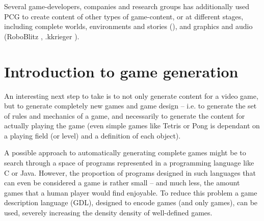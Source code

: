 \documentclass[a4paper,titlepage,final]{report}
\begin{document}
Several game-developers, companies and research groups has additionally used PCG to create content of other types of game-content, or at different stages, including complete worlds, environments and stories (\citep{game:dwarffortress}), and graphics and audio (RoboBlitz \citep{game:roboblitz}, .kkrieger \citep{game:kkrieger}).





\section{Introduction to game generation}
\label{sec_introtogamegen}
An interesting next step to take is to not only generate content for a video game, but to generate completely new games and game design -- i.e. to generate the set of rules and mechanics of a game, and necessarily to generate the content for actually playing the game (even simple games like Tetris or Pong is dependant on a playing field (or level) and a definition of each object).

A possible approach to automatically generating complete games might be to search through a space of programs represented in a programming language like C or Java. 
However, the proportion of programs designed in such languages that can even be considered a game is rather small -- and much less, the amount games that a human player would find enjoyable.
To reduce this problem a game description language (GDL), designed to encode games (and only games), can be used, severely increasing the density density of well-defined games.
\end{document}
